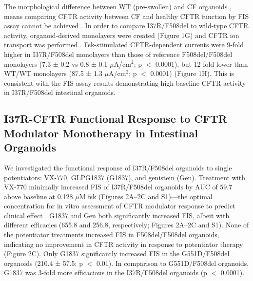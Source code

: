 The morphological difference between WT (pre-swollen) and CF organoids \cite{cuyx2021}, means comparing CFTR activity between CF and healthy CFTR function by FIS assay cannot be achieved \cite{dekkers2016,vanmourik2019}. In order to compare I37R/F508del to wild-type CFTR activity, organoid-derived monolayers were created (Figure 1G) and CFTR ion transport was performed \cite{zomer-vanommen2018}. Fsk-stimulated CFTR-dependent currents were 9-fold higher in I37R/F508del monolayers than those of reference F508del/F508del monolayers (7.3 ± 0.2 vs 0.8 ± 0.1 $\mu$A/cm$^2$; p $<$ 0.0001), but 12-fold lower than WT/WT monolayers (87.5 ± 1.3 $\mu$A/cm$^2$; p $<$ 0.0001) (Figure 1H). This is consistent with the FIS assay results demonstrating high baseline CFTR activity in I37R/F508del intestinal organoids.

\subsection{I37R-CFTR Functional Response to CFTR Modulator Monotherapy in Intestinal Organoids}

We investigated the functional response of I37R/F508del organoids to single potentiators: VX-770, GLPG1837 (G1837), and genistein (Gen). Treatment with VX-770 minimally increased FIS of I37R/F508del organoids by AUC of 59.7 above baseline at 0.128 $\mu$M fsk (Figures 2A–2C and S1)—the optimal concentration for in vitro assessment of CFTR modulator response to predict clinical effect \cite{dekkers2016}. G1837 and Gen both significantly increased FIS, albeit with different efficacies (655.8 and 256.8, respectively; Figures 2A–2C and S1). None of the potentiator treatments increased FIS in F508del/F508del organoids, indicating no improvement in CFTR activity in response to potentiator therapy (Figure 2C). Only G1837 significantly increased FIS in the G551D/F508del organoids (210.4 ± 57.5; p $<$ 0.01). In comparison to G551D/F508del organoids, G1837 was 3-fold more efficacious in the I37R/F508del organoids (p $<$ 0.0001).


